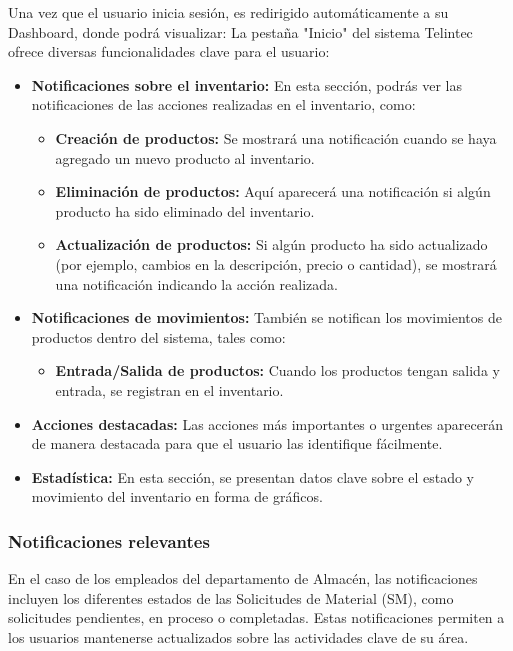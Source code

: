 Una vez que el usuario inicia sesión, es redirigido automáticamente a su Dashboard, donde podrá visualizar: 
La pestaña "Inicio" del sistema Telintec ofrece diversas funcionalidades clave para el usuario:
\begin{itemize}
    \item \textbf{Notificaciones sobre el inventario:} En esta sección, podrás ver las notificaciones de las acciones realizadas en el inventario, como:
    \begin{itemize}
        \item \textbf{Creación de productos:} Se mostrará una notificación cuando se haya agregado un nuevo producto al inventario.
        \item \textbf{Eliminación de productos:} Aquí aparecerá una notificación si algún producto ha sido eliminado del inventario.
        \item \textbf{Actualización de productos:} Si algún producto ha sido actualizado (por ejemplo, cambios en la descripción, precio o cantidad), se mostrará una notificación indicando la acción realizada.
    \end{itemize}

    \item \textbf{Notificaciones de movimientos:} También se notifican los movimientos de productos dentro del sistema, tales como:
    \begin{itemize}
        \item \textbf{Entrada/Salida de productos:} Cuando los productos tengan salida y entrada, se registran en el inventario.
    \end{itemize}

    \item \textbf{Acciones destacadas:} Las acciones más importantes o urgentes aparecerán de manera destacada para que el usuario las identifique fácilmente.

    \item \textbf{Estadística:} En esta sección, se presentan datos clave sobre el estado y movimiento del inventario en forma de gráficos.
\end{itemize}

\subsubsection{Notificaciones relevantes}

En el caso de los empleados del departamento de Almacén, las notificaciones incluyen los diferentes estados de las Solicitudes de Material (SM), como solicitudes pendientes, en proceso o completadas. Estas notificaciones permiten a los usuarios mantenerse actualizados sobre las actividades clave de su área. 

